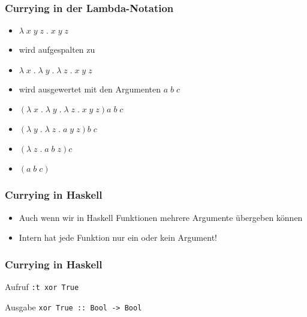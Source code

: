 \begin{frame}
\frametitle{Currying in der Lambda-Notation}
\begin{block}{\vspace*{-3ex}}
\begin{itemize}
  \item $\lambda\;x\;y\;z\;.\;x\;y\;z$
  \item wird aufgespalten zu
  \item <2-7> $\lambda\;x\;.\;\lambda\;y\;.\;\lambda\;z\;.\;x\;y\;z$
  \item <3-7> wird ausgewertet mit den Argumenten $a\;b\;c$
  \item <4-7> $(\lambda\;x\;.\;\lambda\;y\;.\;\lambda\;z\;.\;x\;y\;z) a\;b\;c$
  \item <5-7> $(\lambda\;y\;.\;\lambda\;z\;.\;a\;y\;z) b\;c$
  \item <6-7> $(\lambda\;z\;.\;a\;b\;z) c$
  \item <7> $(a\;b\;c)$
\end{itemize}
\end{block}
\end{frame}

\begin{frame}
\frametitle{Currying in Haskell}
\begin{block}{\vspace*{-3ex}}
\begin{itemize}
  \item Auch wenn wir in Haskell Funktionen mehrere Argumente übergeben können
  \item Intern hat jede Funktion nur ein oder kein Argument!
\end{itemize}
\end{block}
\end{frame}

\begin{frame}
\frametitle{Currying in Haskell}
\begin{block}{Aufruf}
\lstinline|:t xor True|
\end{block}
\begin{block}{Ausgabe}
\lstinline|xor True :: Bool -> Bool|
\end{block}
\end{frame}


